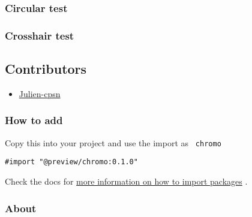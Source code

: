 \subsubsection{Circular test}\label{circular-test}

\begin{Shaded}
\begin{Highlighting}[]
\end{Highlighting}
\end{Shaded}

\subsubsection{Crosshair test}\label{crosshair-test}

\begin{Shaded}
\begin{Highlighting}[]
\end{Highlighting}
\end{Shaded}

\subsection{Contributors}\label{contributors}

\begin{itemize}
\tightlist
\item
  \href{https://github.com/julien-cpsn}{Julien-cpsn}
\end{itemize}

\subsubsection{How to add}\label{how-to-add}

Copy this into your project and use the import as \texttt{\ chromo\ }

\begin{verbatim}
#import "@preview/chromo:0.1.0"
\end{verbatim}



Check the docs for
\href{https://typst.app/docs/reference/scripting/\#packages}{more
information on how to import packages} .

\subsubsection{About}\label{about}

